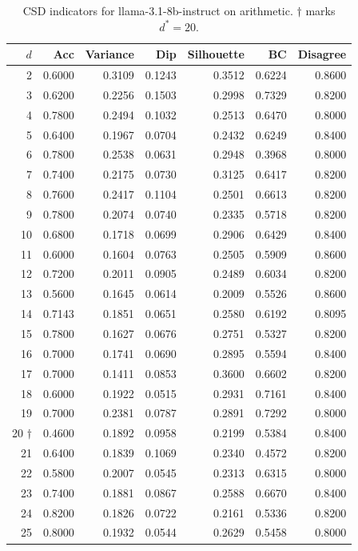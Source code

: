 \documentclass[11pt]{article}
\begin{document}
\begin{table}[h]\centering\small
\begin{tabular}{r|r|r|r|r|r|r}
\toprule
$d$ & Acc & Variance & Dip & Silhouette & BC & Disagree \\
\midrule
2 & 0.6000 & 0.3109 & 0.1243 & 0.3512 & 0.6224 & 0.8600 \\
3 & 0.6200 & 0.2256 & 0.1503 & 0.2998 & 0.7329 & 0.8200 \\
4 & 0.7800 & 0.2494 & 0.1032 & 0.2513 & 0.6470 & 0.8000 \\
5 & 0.6400 & 0.1967 & 0.0704 & 0.2432 & 0.6249 & 0.8400 \\
6 & 0.7800 & 0.2538 & 0.0631 & 0.2948 & 0.3968 & 0.8000 \\
7 & 0.7400 & 0.2175 & 0.0730 & 0.3125 & 0.6417 & 0.8200 \\
8 & 0.7600 & 0.2417 & 0.1104 & 0.2501 & 0.6613 & 0.8200 \\
9 & 0.7800 & 0.2074 & 0.0740 & 0.2335 & 0.5718 & 0.8200 \\
10 & 0.6800 & 0.1718 & 0.0699 & 0.2906 & 0.6429 & 0.8400 \\
11 & 0.6000 & 0.1604 & 0.0763 & 0.2505 & 0.5909 & 0.8600 \\
12 & 0.7200 & 0.2011 & 0.0905 & 0.2489 & 0.6034 & 0.8200 \\
13 & 0.5600 & 0.1645 & 0.0614 & 0.2009 & 0.5526 & 0.8600 \\
14 & 0.7143 & 0.1851 & 0.0651 & 0.2580 & 0.6192 & 0.8095 \\
15 & 0.7800 & 0.1627 & 0.0676 & 0.2751 & 0.5327 & 0.8200 \\
16 & 0.7000 & 0.1741 & 0.0690 & 0.2895 & 0.5594 & 0.8400 \\
17 & 0.7000 & 0.1411 & 0.0853 & 0.3600 & 0.6602 & 0.8200 \\
18 & 0.6000 & 0.1922 & 0.0515 & 0.2931 & 0.7161 & 0.8400 \\
19 & 0.7000 & 0.2381 & 0.0787 & 0.2891 & 0.7292 & 0.8000 \\
20 $\dagger$ & 0.4600 & 0.1892 & 0.0958 & 0.2199 & 0.5384 & 0.8400 \\
21 & 0.6400 & 0.1839 & 0.1069 & 0.2340 & 0.4572 & 0.8200 \\
22 & 0.5800 & 0.2007 & 0.0545 & 0.2313 & 0.6315 & 0.8000 \\
23 & 0.7400 & 0.1881 & 0.0867 & 0.2588 & 0.6670 & 0.8400 \\
24 & 0.8200 & 0.1826 & 0.0722 & 0.2161 & 0.5336 & 0.8200 \\
25 & 0.8000 & 0.1932 & 0.0544 & 0.2629 & 0.5458 & 0.8000 \\
\bottomrule
\end{tabular}
\caption{CSD indicators for llama-3.1-8b-instruct on arithmetic. $\dagger$ marks $d^*=20$.}
\end{table}
\end{document}
